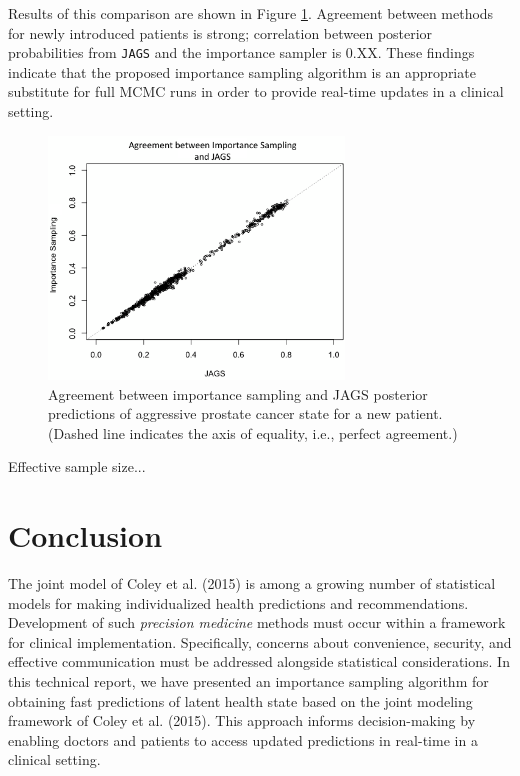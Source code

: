 \documentclass[letterpaper]{article}
\begin{document}
Results of this comparison are shown in Figure \ref{fig:jags-vs-pf}. Agreement between methods for newly introduced patients is strong; correlation between posterior probabilities from \texttt{JAGS} and the importance sampler is 0.XX. These findings indicate that the proposed importance sampling algorithm is an appropriate substitute for full MCMC runs in order to provide real-time updates in a clinical setting. 

\begin{figure}
\begin{center}
\includegraphics[width=0.7\textwidth]{2015-07-01_compare_fits_manual-edit}
\caption{Agreement between importance sampling and JAGS posterior predictions of aggressive prostate cancer state for a new patient. (Dashed line indicates the axis of equality, i.e., perfect agreement.)}
\label{fig:jags-vs-pf}
\end{center}
\end{figure}

Effective sample size...

\section{Conclusion}
The joint model of Coley et al. (2015) is among a growing number of statistical models for making individualized health predictions and recommendations. Development of such \textit{precision medicine} methods must occur within a framework for clinical implementation. Specifically, concerns about convenience, security, and effective communication must be addressed alongside statistical considerations. In this technical report, we have presented an importance sampling algorithm for obtaining fast predictions of latent health state based on the joint modeling framework of Coley et al. (2015). This approach informs decision-making by enabling doctors and patients to access updated predictions in real-time in a clinical setting. 
\end{document}
